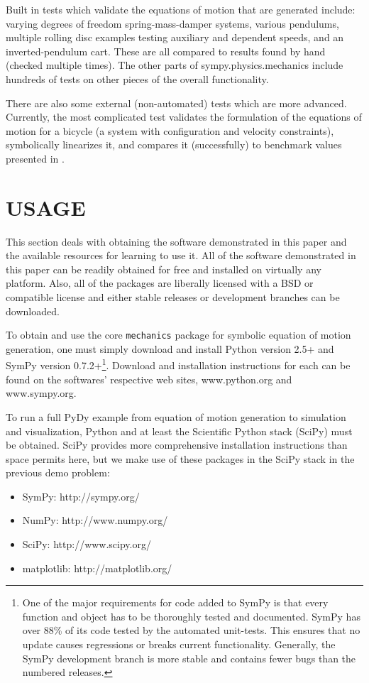 \documentclass[twocolumn,10pt,final]{asme2e}
\begin{document}
Built in tests which validate the equations of motion that are generated
include: varying degrees of freedom spring-mass-damper systems, various
pendulums, multiple rolling disc examples testing auxiliary and dependent
speeds, and an inverted-pendulum cart. These are all compared to results found
by hand (checked multiple times). The other parts of sympy.physics.mechanics
include hundreds of tests on other pieces of the overall functionality.

There are also some external (non-automated) tests which are more advanced.
Currently, the most complicated test validates the formulation of the equations
of motion for a bicycle (a system with configuration and velocity constraints),
symbolically linearizes it, and compares it (successfully) to benchmark values
presented in \cite{Meijaard2007}.

\section*{USAGE}
This section deals with obtaining the software demonstrated in this paper and
the available resources for learning to use it. All of the software
demonstrated in this paper can be readily obtained for free and installed on
virtually any platform. Also, all of the packages are liberally licensed with a
BSD or compatible license and either stable releases or development branches
can be downloaded.

To obtain and use the core \verb|mechanics| package for symbolic equation of
motion generation, one must simply download and install Python version 2.5+ and
SymPy version 0.7.2+\footnote{One of the major requirements for code added to
SymPy is that every function and object has to be thoroughly tested and
documented. SymPy has over 88\% of its code tested by the automated unit-tests.
This ensures that no update causes regressions or breaks current functionality.
Generally, the SymPy development branch is more stable and contains fewer bugs
than the numbered releases.}. Download and installation instructions for each
can be found on the softwares' respective web sites, www.python.org and
www.sympy.org.

To run a full PyDy example from equation of motion generation to simulation and
visualization, Python and at least the Scientific Python stack (SciPy)
\cite{SciPyStackGithub} must be obtained. SciPy provides more comprehensive
installation instructions than space permits here, but we make use of these
packages in the SciPy stack in the previous demo problem:
%
\begin{itemize}
  \item SymPy: http://sympy.org/
  \item NumPy: http://www.numpy.org/
  \item SciPy: http://www.scipy.org/
  \item matplotlib: http://matplotlib.org/
\end{itemize}
\end{document}

